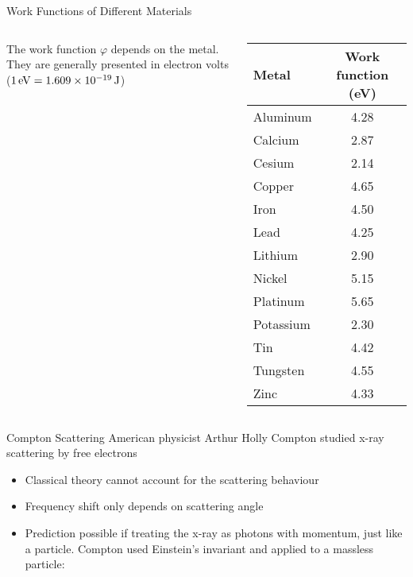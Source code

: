 \documentclass[12pt,compress,aspectratio=169]{beamer}
\newcommand{\pic}[2]{\texttt{[image: \#2]}}
\newcommand{\eq}[2]{\vspace{#1}{\Large\begin{displaymath}#2\end{displaymath}}}
\begin{document}
\begin{frame}{Work Functions of Different Materials}
  \begin{columns}
    The work function $\varphi$ depends on the metal. They are generally
    presented in electron volts ($\SI1{\electronvolt}=\SI{1.609e-19}{\joule}$)

    \begin{tabular}{l|c}
      \rowcolor{pink}
      \textbf{Metal} & \textbf{Work function} (\si{\electronvolt}) \\ \hline
      Aluminum & 4.28 \\ \hline
      Calcium  & 2.87 \\ \hline
      Cesium   & 2.14 \\ \hline
      Copper   & 4.65 \\ \hline
      Iron     & 4.50 \\ \hline
      Lead     & 4.25 \\ \hline
      Lithium  & 2.90 \\ \hline
      Nickel   & 5.15 \\ \hline
      Platinum & 5.65 \\ \hline
      Potassium & 2.30 \\ \hline
      Tin      & 4.42 \\ \hline
      Tungsten & 4.55 \\ \hline
      Zinc     & 4.33 \\
    \end{tabular}
  \end{columns}
\end{frame}


\begin{frame}{Compton Scattering}
  American physicist Arthur Holly Compton studied x-ray scattering by free
  electrons
  \begin{itemize}
  \item Classical theory cannot account for the scattering behaviour
  \item Frequency shift only depends on scattering angle
  \item Prediction possible if treating the x-ray as photons with
    momentum, just like a particle. Compton used Einstein's invariant and
    applied to a massless particle:
  \end{itemize}

  \eq{-.3in}{
    \boxed{p=\frac{E}{c}=\frac{hf}{c}=\frac{h}{\lambda}}
  }
\end{frame}
\end{document}
